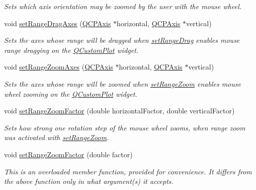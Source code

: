 \begin{DoxyCompactItemize}
\begin{DoxyCompactList}\small\item\em Sets which axis orientation may be zoomed by the user with the mouse wheel. \end{DoxyCompactList}\item 
void \hyperlink{a00116_a9fa10e826a174884391c1c839d52c0a3}{set\+Range\+Drag\+Axes} (\hyperlink{a00025}{Q\+C\+P\+Axis} $\ast$horizontal, \hyperlink{a00025}{Q\+C\+P\+Axis} $\ast$vertical)
\begin{DoxyCompactList}\small\item\em Sets the axes whose range will be dragged when \hyperlink{a00116_aa0e1c44295da2706d0f12ad48f64b806}{set\+Range\+Drag} enables mouse range dragging on the \hyperlink{a00030_d8/d00/a00186}{Q\+Custom\+Plot} widget. \end{DoxyCompactList}\item 
void \hyperlink{a00116_a9808f1736b8116c116bcccb53cdb210a}{set\+Range\+Zoom\+Axes} (\hyperlink{a00025}{Q\+C\+P\+Axis} $\ast$horizontal, \hyperlink{a00025}{Q\+C\+P\+Axis} $\ast$vertical)
\begin{DoxyCompactList}\small\item\em Sets the axes whose range will be zoomed when \hyperlink{a00116_ad4a0919e471549a2daea517ce6538ad8}{set\+Range\+Zoom} enables mouse wheel zooming on the \hyperlink{a00030_d8/d00/a00186}{Q\+Custom\+Plot} widget. \end{DoxyCompactList}\item 
void \hyperlink{a00116_ab0589ec79b1081b13ffb7cf5791a8735}{set\+Range\+Zoom\+Factor} (double horizontal\+Factor, double vertical\+Factor)
\begin{DoxyCompactList}\small\item\em Sets how strong one rotation step of the mouse wheel zooms, when range zoom was activated with \hyperlink{a00116_ad4a0919e471549a2daea517ce6538ad8}{set\+Range\+Zoom}. \end{DoxyCompactList}\item 
void \hyperlink{a00116_abc0e662d15d41f7262a440818c6885d1}{set\+Range\+Zoom\+Factor} (double factor)
\begin{DoxyCompactList}\small\item\em This is an overloaded member function, provided for convenience. It differs from the above function only in what argument(s) it accepts.


\end{DoxyCompactList}
\end{DoxyCompactItemize}
